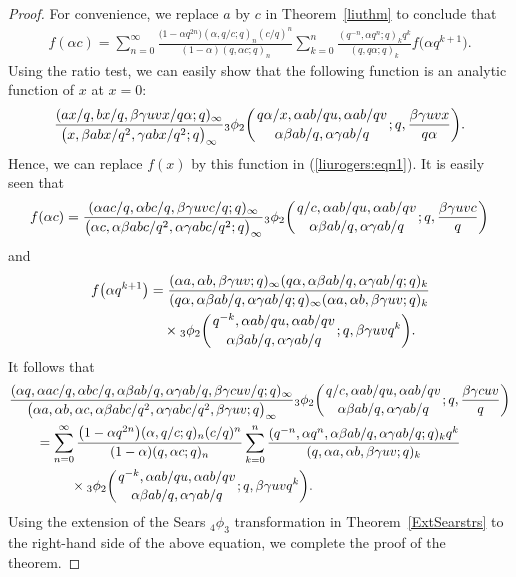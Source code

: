 \documentclass[10pt,a4paper]{amsart}
\numberwithin{equation}{section}
\begin{document}
\begin{proof}
	For convenience, we replace $a$ by $c$ in Theorem~\ref{liuthm} to conclude that
	\begin{align}\label{liurogers:eqn1}
	f(\alpha c)
	=\sum_{n=0}^\infty \frac{\bigl(1-\alpha q^{2n}\bigr)(\alpha, q/c; q)_n (c/q)^n}
	{(1-\alpha)(q, \alpha c; q)_n} \sum_{k=0}^n \frac{(q^{-n}, \alpha q^n; q)_k q^k}
	{(q, q\alpha; q)_k} f\bigl(\alpha q^{k+1}\bigr).
\end{align}
Using the ratio test, we can easily show that the following function is an analytic function of
$x$ at $x=0$:
\begin{align*}
\frac{(ax/q, bx/q, \beta \gamma uvx/q\alpha; q)_\infty}
{\bigl(x, \beta abx/q^2, \gamma abx/q^2; q\bigr)_\infty}
{_3\phi_2}\biggl({{q\alpha/x, \alpha ab/qu, \alpha ab/qv}\atop{\alpha \beta ab/q, \alpha \gamma ab/q}}; q, \frac{\beta \gamma uvx}{q\alpha}\biggr).
\end{align*}
Hence, we can replace $f(x)$ by this function in (\ref{liurogers:eqn1}). It is easily seen that
\begin{align*}
f(\alpha c) = \frac{(\alpha ac/q, \alpha bc/q, \beta \gamma uvc/q; q)_\infty}
{\bigl(\alpha c, \alpha \beta abc/q^2, \alpha \gamma abc/q^2; q\bigr)_\infty} {_3\phi_2}\biggl({{q/c, \alpha ab/qu, \alpha ab/qv}\atop{\alpha \beta ab/q, \alpha \gamma ab/q}}; q, \frac{\beta \gamma uvc}{q}\biggr)
\end{align*}
and
\begin{align*}
f\bigl(\alpha q^{k+1}\bigr)&=\frac{(\alpha a, \alpha b, \beta \gamma uv; q)_\infty (q\alpha, \alpha \beta ab/q, \alpha \gamma ab/q; q)_k}
{(q\alpha, \alpha \beta ab/q, \alpha \gamma ab/q; q)_\infty (\alpha a, \alpha b, \beta \gamma uv; q)_k}\\
&\quad \times {_3\phi_2} \biggl({{q^{-k}, \alpha ab/qu, \alpha ab/qv}
\atop{\alpha \beta ab/q, \alpha \gamma ab/q }}; q, \beta \gamma uv q^k \biggr).
\end{align*}
It follows that
\begin{align*}
& \frac{(\alpha {q}, \alpha ac/q, \alpha bc/q, \alpha \beta ab/q, \alpha \gamma ab/q, \beta \gamma cuv/q; q )_\infty}{\bigl(\alpha a, \alpha b, \alpha c, \alpha \beta abc/q^2, \alpha \gamma abc/q^2, \beta \gamma uv; q \bigr)_\infty}
{_3\phi_2} \biggl({{q/c, \alpha ab/qu, \alpha ab/qv}\atop{\alpha \beta ab/q, \alpha \gamma ab/q}}; q,
\frac{\beta \gamma cuv}{q} \biggr)\\
&\qquad{}=\sum_{n=0}^\infty \frac{\bigl(1-\alpha q^{2n}\bigr) (\alpha, q/c; q)_n (c/q)^n}{(1-\alpha)(q, \alpha c; q)_n}
\sum_{k=0}^{n} \frac{(q^{-n}, \alpha q^n, \alpha \beta ab/q, \alpha \gamma ab/q ; q)_k q^k}
{(q, \alpha a, \alpha b, \beta \gamma uv; q)_k}\\
&\qquad\hphantom{=\sum_{n=0}^\infty}{}
\times {_3\phi_2} \biggl({{q^{-k}, \alpha ab/qu, \alpha ab/qv}
\atop{\alpha \beta ab/q, \alpha \gamma ab/q }}; q, \beta \gamma uv q^k \biggr).
\end{align*}
Using the extension of the Sears $_4\phi_3$ transformation in Theorem~\ref{ExtSearstrs} to
the right-hand side of the above equation, we complete the proof of the theorem.
\end{proof}
\end{document}
